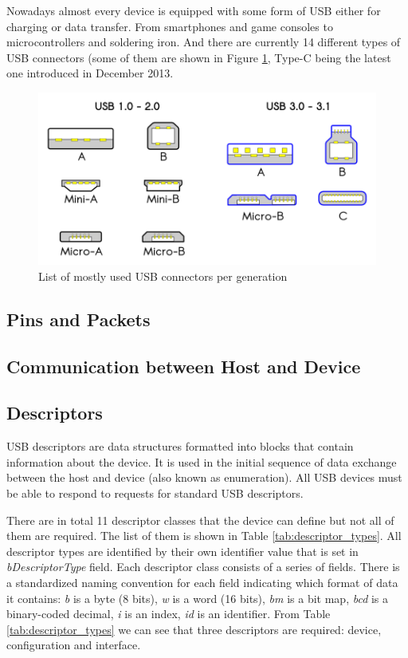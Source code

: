 Nowadays almost every device is equipped with some form of USB either for charging or data transfer. From smartphones and game consoles to microcontrollers and soldering iron. And there are currently 14 different types of USB connectors (some of them are shown in Figure \ref{fig:usb_connectors}, Type-C being the latest one introduced in December 2013.

\begin{figure}[ht]
    \centering
    \includegraphics{obrazky-figures/USB_2.0_and_3.0_connectors.png}
    \caption{List of mostly used USB connectors per generation}
    \label{fig:usb_connectors}
\end{figure}

\subsection*{Pins and Packets}
\label{packets}

\subsection*{Communication between Host and Device}
\label{communication}
\subsection*{Descriptors}
\label{descriptor}
USB descriptors are data structures formatted into blocks that contain information about the device. It is used in the initial sequence of data exchange between the host and device (also known as enumeration). All USB devices must be able to respond to requests for standard USB descriptors.

There are in total 11 descriptor classes that the device can define but not all of them are required. The list of them is shown in Table \ref{tab:descriptor_types}. All descriptor types are identified by their own identifier value that is set in \emph{bDescriptorType} field. Each descriptor class consists of a series of fields. There is a standardized naming convention for each field indicating which format of data it contains: \emph{b} is a byte (8 bits), \emph{w} is a word (16 bits), \emph{bm} is a bit map, \emph{bcd} is a binary-coded decimal, \emph{i} is an index, \emph{id} is an identifier. From Table \ref{tab:descriptor_types} we can see that three descriptors are required: device, configuration and interface.

